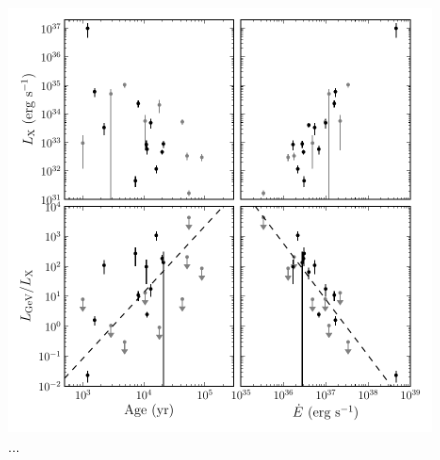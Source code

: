 \begin{figure}[htbp]
  \centering
  \includegraphics{chapters/population_study/figures/pwn_age_edot_vs_l_xray.pdf}
  \caption{...}
\end{figure}

